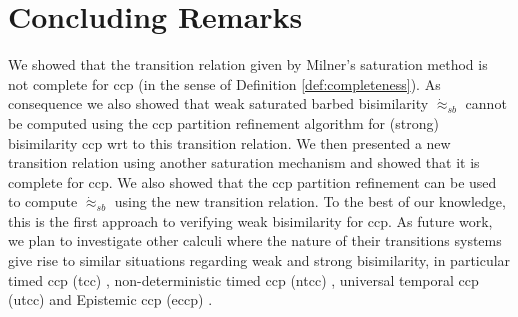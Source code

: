 \documentclass[copyright,creativecommons]{eptcs}
\newcommand{\wsatbis}{\dot{\approx}_{sb}}
\begin{document}
\section{Concluding Remarks} \label{sec:conclusions}
We showed that the transition relation given by Milner's saturation method is
not complete for ccp (in the sense of Definition \ref{def:completeness}). As
consequence we also showed that weak saturated barbed bisimilarity $\wsatbis$
\cite{Aristizabal:11:FOSSACS}  cannot be computed using the ccp partition
refinement algorithm for (strong) bisimilarity ccp wrt to this transition
relation.
We then presented a new transition relation using another saturation mechanism
and showed that it is complete for ccp. We also showed that
the ccp partition refinement can be used to compute $\wsatbis$ using the new
transition relation.
To the best of our knowledge, this is the first approach to verifying weak
bisimilarity for ccp.  As future work,  we plan to investigate
other calculi where the nature of their transitions systems give rise to similar
situations regarding weak and strong bisimilarity,
in particular timed ccp (tcc) \cite{Saraswat:94:LICS},
non-deterministic timed ccp (ntcc) \cite{Palamidessi:01:CP},
universal temporal ccp (utcc) \cite{Olarte:08:SAC}
and Epistemic ccp (eccp) \cite{eccp-extended-version}.




\end{document}
